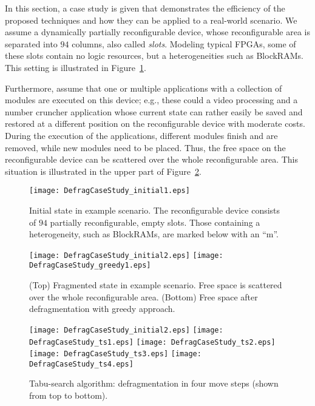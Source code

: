\documentclass{article}
\begin{document}
In this section, a case study is given that demonstrates the
efficiency of the proposed techniques and how they can be applied to a
real-world scenario. We assume a dynamically partially
reconfigurable device, whose reconfigurable area is separated into
$94$ columns, also called {\em slots}. Modeling typical FPGAs, some of these slots contain
no logic resources, but a heterogeneities such as
BlockRAMs. This setting is illustrated in Figure~\ref{fig:casestudy_initial1}.

Furthermore, assume that one or multiple applications with a collection of
modules are executed on this device; e.g., these could a video
processing and a number cruncher application whose current state can
rather easily be saved and restored at a different position on the
reconfigurable device with moderate costs. During the execution of the
applications, different modules finish and are removed, while new modules
need to be placed. Thus, the free space on the reconfigurable device
can be scattered over the whole reconfigurable area. This situation is
illustrated in the upper part of Figure~\ref{fig:casestudy_greedy}.

\begin{figure}[p]
\centering
\texttt{[image: DefragCaseStudy\_initial1.eps]}
\caption{\label{fig:casestudy_initial1} Initial state in example scenario. The
reconfigurable device consists of $94$ partially reconfigurable, empty slots.
Those containing a heterogeneity, such as BlockRAMs, are marked below with an
``m''.} \end{figure}

\begin{figure}[p]
\centering
\texttt{[image: DefragCaseStudy\_initial2.eps]}
\texttt{[image: DefragCaseStudy\_greedy1.eps]}
\caption{\label{fig:casestudy_greedy} (Top) Fragmented state in example scenario. Free space is scattered over the whole reconfigurable area. 
(Bottom) Free space after defragmentation with greedy approach.}
\end{figure}

\begin{figure}[p]
\centering
\texttt{[image: DefragCaseStudy\_initial2.eps]}
\texttt{[image: DefragCaseStudy\_ts1.eps]}
\texttt{[image: DefragCaseStudy\_ts2.eps]}
\texttt{[image: DefragCaseStudy\_ts3.eps]}
\texttt{[image: DefragCaseStudy\_ts4.eps]}
\caption{\label{fig:casestudy_ts} Tabu-search algorithm: defragmentation in four move steps (shown from top to bottom).}
\end{figure}
\end{document}
